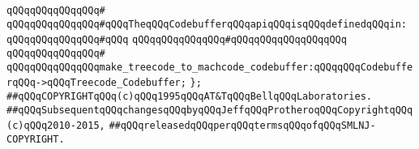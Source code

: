 \verb|qQQqqQQqqQQqqQQq#|\newline
\verb|qQQqqQQqqQQqqQQq#qQQqTheqQQqCodebufferqQQqapiqQQqisqQQqdefinedqQQqin:|\newline
\verb|qQQqqQQqqQQqqQQq#qQQq|\newline
\verb|qQQqqQQqqQQqqQQq#qQQqqQQqqQQqqQQqqQQq|\newline
\verb|qQQqqQQqqQQqqQQq#|\newline
\verb|qQQqqQQqqQQqqQQqmake_treecode_to_machcode_codebuffer:qQQqqQQqCodebufferqQQq->qQQqTreecode_Codebuffer;|\newline
\verb|};|\newline
\newline
\newline
\newline
\newline
\newline
\newline
\verb|##qQQqCOPYRIGHTqQQq(c)qQQq1995qQQqAT&TqQQqBellqQQqLaboratories.|\newline
\verb|##qQQqSubsequentqQQqchangesqQQqbyqQQqJeffqQQqProtheroqQQqCopyrightqQQq(c)qQQq2010-2015,|\newline
\verb|##qQQqreleasedqQQqperqQQqtermsqQQqofqQQqSMLNJ-COPYRIGHT.|\newline

